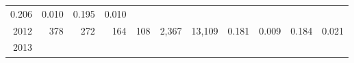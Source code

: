 \documentclass[]{article}
\begin{document}
\begin{longtable}[]{@{}rrrrrrrrrrr@{}}
\begin{minipage}[t]{0.09\columnwidth}
0.206\strut
\end{minipage} & \begin{minipage}[t]{0.05\columnwidth}\raggedleft\strut
0.010\strut
\end{minipage} & \begin{minipage}[t]{0.10\columnwidth}\raggedleft\strut
0.195\strut
\end{minipage} & \begin{minipage}[t]{0.04\columnwidth}\raggedleft\strut
0.010\strut
\end{minipage}\tabularnewline
\begin{minipage}[t]{0.06\columnwidth}\raggedleft\strut
2012\strut
\end{minipage} & \begin{minipage}[t]{0.07\columnwidth}\raggedleft\strut
378\strut
\end{minipage} & \begin{minipage}[t]{0.07\columnwidth}\raggedleft\strut
272\strut
\end{minipage} & \begin{minipage}[t]{0.07\columnwidth}\raggedleft\strut
164\strut
\end{minipage} & \begin{minipage}[t]{0.07\columnwidth}\raggedleft\strut
108\strut
\end{minipage} & \begin{minipage}[t]{0.07\columnwidth}\raggedleft\strut
2,367\strut
\end{minipage} & \begin{minipage}[t]{0.05\columnwidth}\raggedleft\strut
13,109\strut
\end{minipage} & \begin{minipage}[t]{0.09\columnwidth}\raggedleft\strut
0.181\strut
\end{minipage} & \begin{minipage}[t]{0.05\columnwidth}\raggedleft\strut
0.009\strut
\end{minipage} & \begin{minipage}[t]{0.10\columnwidth}\raggedleft\strut
0.184\strut
\end{minipage} & \begin{minipage}[t]{0.04\columnwidth}\raggedleft\strut
0.021\strut
\end{minipage}\tabularnewline
\begin{minipage}[t]{0.06\columnwidth}\raggedleft\strut
2013\strut
\end{minipage} & \begin{minipage}[t]{0.07\columnwidth}\raggedleft\strut

\end{minipage}
\end{longtable}
\end{document}
